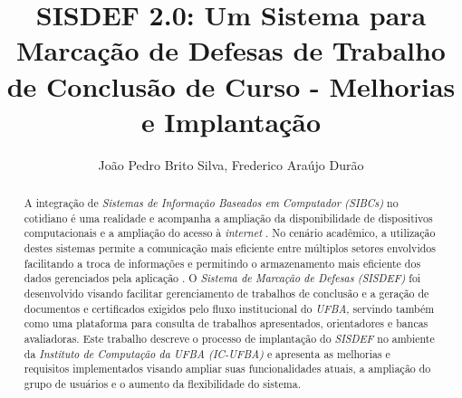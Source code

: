 \documentclass[nonacm, sigconf]{acmart}
\begin{document}
\title{SISDEF 2.0: Um Sistema para Marcação de Defesas de Trabalho de Conclusão de Curso - Melhorias e Implantação}

\author{João Pedro Brito Silva, Frederico Araújo Durão}



\renewcommand{\shortauthors}{João Pedro Brito Silva, Frederico Araújo Durão}

\begin{abstract}
    A integração de \textit{Sistemas de Informação Baseados em Computador (SIBCs)} no cotidiano é uma realidade e acompanha a ampliação da disponibilidade de dispositivos computacionais e a ampliação do acesso à \textit{internet} \cite{ticbr2023}. No cenário acadêmico, a utilização destes sistemas permite a comunicação mais eficiente entre múltiplos setores envolvidos facilitando a troca de informações e permitindo o armazenamento mais eficiente dos dados gerenciados pela aplicação \cite{murdick1984information}. O \textit{Sistema de Marcação de Defesas (SISDEF)} foi desenvolvido visando facilitar gerenciamento de trabalhos de conclusão e a geração de documentos e certificados exigidos pelo fluxo institucional do \textit{UFBA}, servindo também como uma plataforma para consulta de trabalhos apresentados, orientadores e bancas avaliadoras. Este trabalho descreve o processo de implantação do \textit{SISDEF} no ambiente da \textit{Instituto de Computação da UFBA (IC-UFBA)} e apresenta as melhorias e requisitos implementados visando ampliar suas funcionalidades atuais, a ampliação do grupo de usuários e o aumento da flexibilidade do sistema.
\end{abstract}
\end{document}
